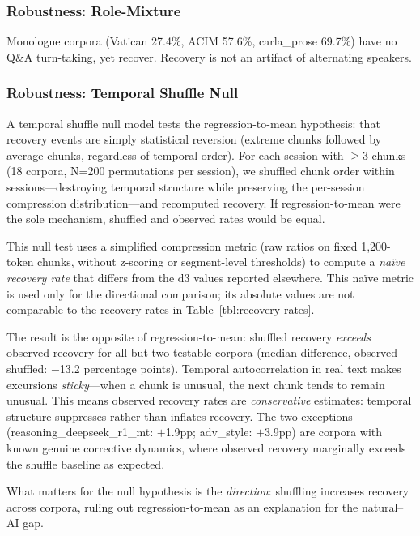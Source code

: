 \documentclass[final]{clv2025}
\begin{document}
\subsubsection{Robustness: Role-Mixture}

Monologue corpora (Vatican 27.4\%, ACIM 57.6\%, carla\_prose 69.7\%) have no Q\&A turn-taking, yet recover. Recovery is not an artifact of alternating speakers.

\subsubsection{Robustness: Temporal Shuffle Null}

A temporal shuffle null model tests the regression-to-mean hypothesis: that recovery events are simply statistical reversion (extreme chunks followed by average chunks, regardless of temporal order). For each session with $\geq$3 chunks (18 corpora, N=200 permutations per session), we shuffled chunk order within sessions---destroying temporal structure while preserving the per-session compression distribution---and recomputed recovery. If regression-to-mean were the sole mechanism, shuffled and observed rates would be equal.

This null test uses a simplified compression metric (raw ratios on fixed 1,200-token chunks, without z-scoring or segment-level thresholds) to compute a \textit{na\"ive recovery rate} that differs from the d3 values reported elsewhere. This na\"ive metric is used only for the directional comparison; its absolute values are not comparable to the recovery rates in Table~\ref{tbl:recovery-rates}.

The result is the opposite of regression-to-mean: shuffled recovery \textit{exceeds} observed recovery for all but two testable corpora (median difference, observed $-$ shuffled: $-$13.2 percentage points). Temporal autocorrelation in real text makes excursions \textit{sticky}---when a chunk is unusual, the next chunk tends to remain unusual. This means observed recovery rates are \textit{conservative} estimates: temporal structure suppresses rather than inflates recovery. The two exceptions (reasoning\_deepseek\_r1\_mt: $+$1.9pp; adv\_style: $+$3.9pp) are corpora with known genuine corrective dynamics, where observed recovery marginally exceeds the shuffle baseline as expected.

What matters for the null hypothesis is the \textit{direction}: shuffling increases recovery across corpora, ruling out regression-to-mean as an explanation for the natural--AI gap.
\end{document}
